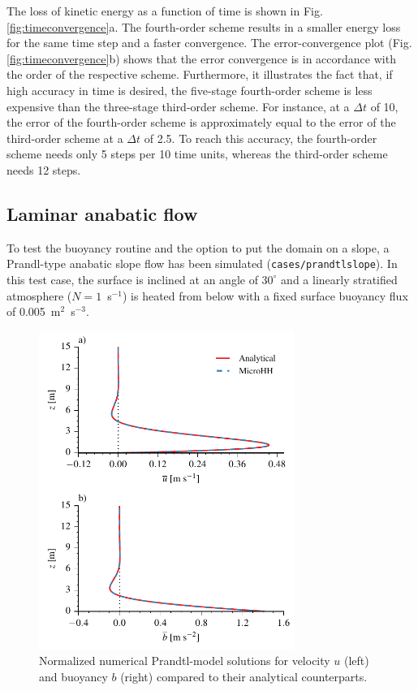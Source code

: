 \documentclass[gmd,manuscript]{copernicus}
\begin{document}
The loss of kinetic energy as a function of time is shown in Fig. \ref{fig:timeconvergence}a. The fourth-order scheme results in a smaller energy loss for the same time step and a faster convergence. The error-convergence plot (Fig. \ref{fig:timeconvergence}b) shows that the error convergence is in accordance with the order of the respective scheme. Furthermore, it illustrates the fact that, if high accuracy in time is desired, the five-stage fourth-order scheme is less expensive than the three-stage third-order scheme. For instance, at a $\Delta t$ of 10, the error of the fourth-order scheme is approximately equal to the error of the third-order scheme at a $\Delta t$ of 2.5. To reach this accuracy, the fourth-order scheme needs only 5 steps per 10 time units, whereas the third-order scheme needs 12 steps.

\subsection{Laminar anabatic flow} \label{sec:laminaranabatic}
To test the buoyancy routine and the option to put the domain on a slope, a Prandl-type anabatic slope flow  \citep{Prandtl1942} has been simulated (\texttt{cases/prandtlslope}). In this test case, the surface is inclined at an angle of $30^{\circ}$ and a linearly stratified atmosphere ($N = 1$~s$^{-1}$) is heated from below with a fixed surface buoyancy flux of 0.005~m$^2$~s$^{-3}$.

\begin{figure}[t]
	\vspace*{2mm}
	\begin{center}
		\includegraphics[width=8.3cm]{figs/prandtlslope.pdf}
	\end{center}
	\caption{Normalized numerical Prandtl-model solutions for velocity $u$ (left) and buoyancy $b$ (right) compared to their analytical counterparts.}
	\label{fig:prandtl}
\end{figure}
\end{document}
